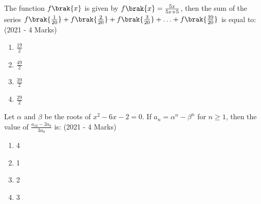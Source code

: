     \item{
	
			The function \( f\brak{x} \) is given by \( f\brak{x} = \frac{5x}{5x+5} \), then the sum of the series \( f\brak{\frac{1}{20}} + f\brak{\frac{2}{20}} + f\brak{\frac{3}{20}} + \ldots + f\brak{\frac{39}{20}} \) is equal to:
			\text{   }\hfill
			{(2021 - 4 Marks)}
			\begin{multicols}{4}
				\begin{enumerate}
					\item $\frac{19}{2}$
					\item $\frac{49}{2}$
					\item $\frac{39}{2}$
					\item $\frac{29}{2}$
				\end{enumerate}
			\end{multicols}
			
		}
    \item{
        
            Let $\alpha$ and $\beta$ be the roots of $x^2 - 6x - 2 = 0$. If $a_n = \alpha^n - \beta^n$ for $n \geq 1$, then the value of $\frac{a_{10} - 2a_8}{3a_9}$ is:
             \hfill
              {(2021 - 4 Marks)}
              \begin{multicols}{4}
	              	\begin{enumerate}
	              		\item 4
	              		\item 1
	              		\item 2
	              		\item 3
	              	\end{enumerate}
              \end{multicols}
        
        }


